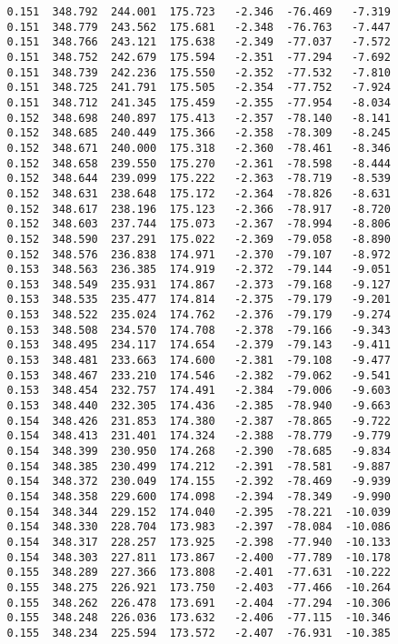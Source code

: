 \begin{verbatim}
   0.151  348.792  244.001  175.723   -2.346  -76.469   -7.319
   0.151  348.779  243.562  175.681   -2.348  -76.763   -7.447
   0.151  348.766  243.121  175.638   -2.349  -77.037   -7.572
   0.151  348.752  242.679  175.594   -2.351  -77.294   -7.692
   0.151  348.739  242.236  175.550   -2.352  -77.532   -7.810
   0.151  348.725  241.791  175.505   -2.354  -77.752   -7.924
   0.151  348.712  241.345  175.459   -2.355  -77.954   -8.034
   0.152  348.698  240.897  175.413   -2.357  -78.140   -8.141
   0.152  348.685  240.449  175.366   -2.358  -78.309   -8.245
   0.152  348.671  240.000  175.318   -2.360  -78.461   -8.346
   0.152  348.658  239.550  175.270   -2.361  -78.598   -8.444
   0.152  348.644  239.099  175.222   -2.363  -78.719   -8.539
   0.152  348.631  238.648  175.172   -2.364  -78.826   -8.631
   0.152  348.617  238.196  175.123   -2.366  -78.917   -8.720
   0.152  348.603  237.744  175.073   -2.367  -78.994   -8.806
   0.152  348.590  237.291  175.022   -2.369  -79.058   -8.890
   0.152  348.576  236.838  174.971   -2.370  -79.107   -8.972
   0.153  348.563  236.385  174.919   -2.372  -79.144   -9.051
   0.153  348.549  235.931  174.867   -2.373  -79.168   -9.127
   0.153  348.535  235.477  174.814   -2.375  -79.179   -9.201
   0.153  348.522  235.024  174.762   -2.376  -79.179   -9.274
   0.153  348.508  234.570  174.708   -2.378  -79.166   -9.343
   0.153  348.495  234.117  174.654   -2.379  -79.143   -9.411
   0.153  348.481  233.663  174.600   -2.381  -79.108   -9.477
   0.153  348.467  233.210  174.546   -2.382  -79.062   -9.541
   0.153  348.454  232.757  174.491   -2.384  -79.006   -9.603
   0.153  348.440  232.305  174.436   -2.385  -78.940   -9.663
   0.154  348.426  231.853  174.380   -2.387  -78.865   -9.722
   0.154  348.413  231.401  174.324   -2.388  -78.779   -9.779
   0.154  348.399  230.950  174.268   -2.390  -78.685   -9.834
   0.154  348.385  230.499  174.212   -2.391  -78.581   -9.887
   0.154  348.372  230.049  174.155   -2.392  -78.469   -9.939
   0.154  348.358  229.600  174.098   -2.394  -78.349   -9.990
   0.154  348.344  229.152  174.040   -2.395  -78.221  -10.039
   0.154  348.330  228.704  173.983   -2.397  -78.084  -10.086
   0.154  348.317  228.257  173.925   -2.398  -77.940  -10.133
   0.154  348.303  227.811  173.867   -2.400  -77.789  -10.178
   0.155  348.289  227.366  173.808   -2.401  -77.631  -10.222
   0.155  348.275  226.921  173.750   -2.403  -77.466  -10.264
   0.155  348.262  226.478  173.691   -2.404  -77.294  -10.306
   0.155  348.248  226.036  173.632   -2.406  -77.115  -10.346
   0.155  348.234  225.594  173.572   -2.407  -76.931  -10.385

\end{verbatim}
